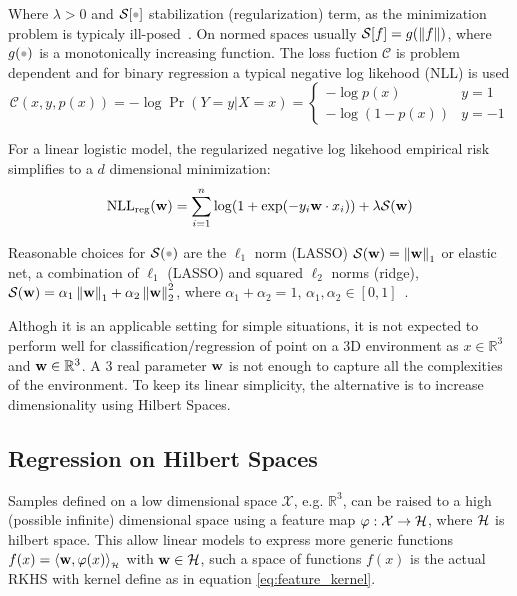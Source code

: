 Where $\lambda>0$ and $\mathcal{S}[\parm]$ stabilization (regularization) term,
as the minimization problem is typicaly
ill-posed~\cite{jaakkola1999probabilistic}. On normed spaces usually
$\mathcal{S}[f]=g(\left\lVert f\right\rVert)$, where $g(\parm)$ is a monotonically increasing
function.
The loss fuction $\mathscr{C}$ is problem dependent and for binary regression a typical negative log likehood (NLL) is used
\begin{equation}
\mathscr{C}(x,y,p(x)) = - \log \Pr(Y=y|X=x) = 
\begin{cases} 
      - \log p(x) & y=1 \\
      - \log (1-p(x)) & y=-1
   \end{cases}
\end{equation}

For a linear logistic model, the regularized negative log likehood empirical
risk simplifies to a $d$ dimensional minimization:
\begin{equation}
\label{eq:classicnll}
\text{NLL}_{\text{reg}}(\mathrm{\mathbf{w}}) =  \sum_{i=1}^n \log(1+\exp(-y_i
\mathrm{\mathbf{w}}\cdot x_i)) +\lambda\mathcal{S}(\mathrm{\mathbf{w}})
\end{equation}


Reasonable choices for $\mathcal{S}(\parm)$
are the $\ell_1$ norm (LASSO)
$\mathcal{S}(\mathrm{\mathbf{w}})=\left\lVert\mathrm{\mathbf{w}}\right\rVert_1$
or elastic net, a combination of $\ell_1$ (LASSO) and
squared $\ell_2$ norms (ridge),
$\mathcal{S}(\mathrm{\mathbf{w}})=\alpha_1\left\lVert\mathrm{\mathbf{w}}\right\rVert_1
+\alpha_2\left\lVert\mathrm{\mathbf{w}}\right\rVert_2^2$, where
$\alpha_1+\alpha_2=1$, $\alpha_1,\alpha_2\in[0,1]$~\cite{hastie2015statistical}.


Althogh it is an applicable setting for simple situations, it is not expected to
perform well for classification/regression of point on a 3D environment as
$x\in\mathbb{R}^3$ and $\mathrm{\mathbf{w}}\in\mathbb{R}^3$. A 3 real parameter
$\mathrm{\mathbf{w}}$ is not enough to capture all the complexities of the environment. To
keep its linear simplicity, the alternative is to increase dimensionality using
Hilbert Spaces.

\subsection{Regression on Hilbert Spaces}
\label{ss:reg_hs}
Samples defined on a low dimensional space $\mathcal{X}$, e.g. $\mathbb{R}^3$,
can be raised to a high (possible infinite) dimensional space using a feature
map $\varphi:\mathcal{X}\to\mathcal{H}$, where $\mathcal{H}$ is hilbert space. This allow
linear models to express more generic functions $f(x) =
\langle \mathrm{\mathbf{w}},\varphi(x)\rangle_{_{\mathcal{H}}}$ with $\mathrm{\mathbf{w}}\in\mathcal{H}$, such a space of functions
$f(x)$ is the actual RKHS with kernel define as in equation
\ref{eq:feature_kernel}.

